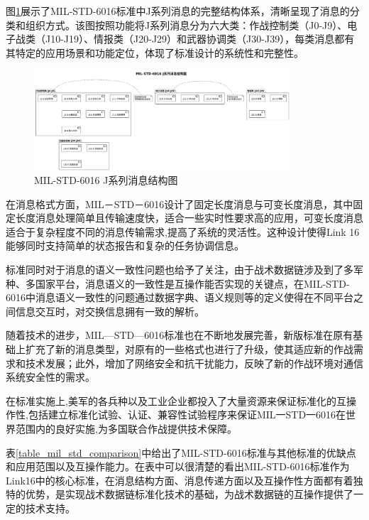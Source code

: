图\ref{fig_j_series_message_structure}展示了MIL-STD-6016标准中J系列消息的完整结构体系，清晰呈现了消息的分类和组织方式。该图按照功能将J系列消息分为六大类：作战控制类（J0-J9）、电子战类（J10-J19）、情报类（J20-J29）和武器协调类（J30-J39），每类消息都有其特定的应用场景和功能定位，体现了标准设计的系统性和完整性。

\begin{figure}[H]
    \centering
    \includegraphics[width=0.85\textwidth,height=0.6\textheight,keepaspectratio]{chapters/fig-0/j_series_message_structure.png}
    \caption{MIL-STD-6016 J系列消息结构图}
    \label{fig_j_series_message_structure}
\end{figure}

在消息格式方面，MIL－STD－6016设计了固定长度消息与可变长度消息，其中固定长度消息处理简单且传输速度快，适合一些实时性要求高的应用，可变长度消息适合于复杂程度不同的消息传输需求,提高了系统的灵活性。这种设计使得Link 16能够同时支持简单的状态报告和复杂的任务协调信息。

标准同时对于消息的语义一致性问题也给予了关注，由于战术数据链涉及到了多军种、多国家平台，消息语义的一致性是互操作能否实现的关键点，在MIL-STD-6016中消息语义一致性的问题通过数据字典、语义规则等的定义使得在不同平台之间信息交互时，对交换信息拥有一致的解析。

随着技术的进步，MIL—STD—6016标准也在不断地发展完善，新版标准在原有基础上扩充了新的消息类型，对原有的一些格式也进行了升级，使其适应新的作战需求和技术发展；此外，增加了网络安全和抗干扰能力，反映了新的作战环境对通信系统安全性的需求。

在标准实施上,美军的各兵种以及工业企业都投入了大量资源来保证标准化的互操作性,包括建立标准化试验、认证、兼容性试验程序来保证MIL一STD一6016在世界范围内的良好实施,为多国联合作战提供技术保障。

表\ref{table_mil_std_comparison}中给出了MIL-STD-6016标准与其他标准的优缺点和应用范围以及互操作能力。在表中可以很清楚的看出MIL-STD-6016标准作为Link16中的核心标准，在消息结构方面、消息传递方面以及互操作性方面都有着独特的优势，是实现战术数据链标准化技术的基础，为战术数据链的互操作提供了一定的技术支持。

